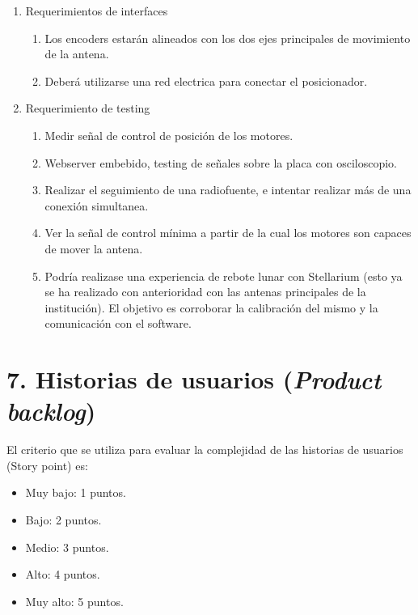 \documentclass[11pt, %
codirector, %
]{charter}
\begin{document}
\begin{enumerate}
	\item Requerimientos de interfaces
		\begin{enumerate}
			\item Los encoders estarán alineados con los dos ejes principales de movimiento de la antena. 
			\item Deberá utilizarse una red electrica para conectar el posicionador.
		\end{enumerate}
	\item Requerimiento de testing
		\begin{enumerate}
			\item Medir señal de control de posición de los motores.
			\item Webserver embebido, testing de señales sobre la placa con osciloscopio.
			\item Realizar el seguimiento de una radiofuente, e intentar realizar más de una conexión simultanea. 
			\item Ver la señal de control mínima a partir de la cual los motores son capaces de mover la antena. 
			\item Podría realizase una experiencia de rebote lunar con Stellarium (esto ya se ha realizado con anterioridad con las antenas principales de la institución). El objetivo es corroborar la calibración del mismo y la comunicación con el software.  

		\end{enumerate}
\end{enumerate}

\section{7. Historias de usuarios (\textit{Product backlog})}
\label{sec:backlog}

%
%
%
El criterio que se utiliza para evaluar la complejidad de las  historias de usuarios (Story point) es:
\begin{itemize}
	\item Muy bajo: 1 puntos. 
	\item Bajo: 2 puntos.
	\item Medio: 3 puntos. 
	\item Alto: 4 puntos. 
	\item Muy alto: 5 puntos.
\end{itemize}
\end{document}
